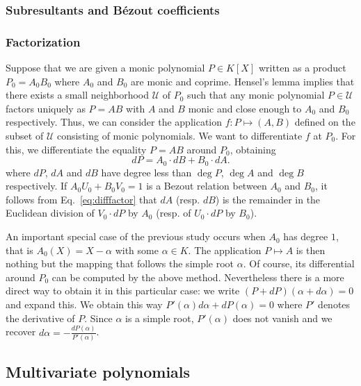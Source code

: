 \documentclass{lms}
\begin{document}
\subsubsection*{Subresultants and B\'ezout coefficients}


\subsubsection*{Factorization}

Suppose that we are given a monic polynomial $P \in K[X]$ written as a 
product $P_0 = A_0 B_0$ where $A_0$ and $B_0$ are monic and coprime. 
Hensel's lemma implies that there exists a small neighborhood $\mathcal 
U$ of $P_0$ such that any monic polynomial $P \in \mathcal U$ factors 
uniquely as $P = A B$ with $A$ and $B$ monic and close enough to $A_0$ 
and $B_0$ respectively. Thus, we can consider the application $f : P 
\mapsto (A,B)$ defined on the subset of $\mathcal U$ consisting of monic 
polynomials. We want to differentiate $f$ at $P_0$. For this, we 
differentiate the equality $P = A B$ around $P_0$, obtaining
\begin{equation}
\label{eq:difffactor}
dP = A_0 \cdot dB + B_0 \cdot dA.
\end{equation}
where $dP$, $dA$ and $dB$ have degree less than $\deg P$, $\deg A$ and 
$\deg B$ respectively. If $A_0 U_0 + B_0 V_0 = 1$ is a Bezout relation
between $A_0$ and $B_0$, it follows from Eq.~\eqref{eq:difffactor} that
$dA$ (resp. $dB$) is the remainder in the Euclidean division of $V_0
{\cdot} dP$ by $A_0$ (resp. of $U_0 {\cdot} dP$ by $B_0$).

An important special case of the previous study occurs when $A_0$ has 
degree $1$, that is $A_0(X) = X - \alpha$ with some $\alpha \in K$. The 
application $P \mapsto A$ is then nothing but the mapping that follows 
the simple root $\alpha$. Of course, its differential around $P_0$ can 
be computed by the above method. Nevertheless there is a more direct way 
to obtain it in this particular case: we write $(P + dP)(\alpha + 
d\alpha) = 0$ and expand this. We obtain this way $P'(\alpha) d\alpha + 
dP(\alpha) = 0$ where $P'$ denotes the derivative of $P$. Since $\alpha$ 
is a simple root, $P'(\alpha)$ does not vanish and we recover $d \alpha 
= - \frac{dP(\alpha)}{P'(\alpha)}$.

\subsection{Multivariate polynomials}
\end{document}

